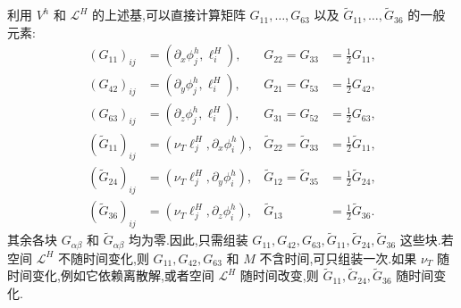 \begin{note}[方法(8.288)的实现]
利用 $V^h$ 和 $\mathcal L^H$ 的上述基,可以直接计算矩阵 $G_{11},\ldots,G_{63}$ 以及 $\widetilde G_{11},\ldots,\widetilde G_{36}$ 的一般元素:
\begin{equation}\label{eq:vms-coarse-projection-implementation-blocks}
\begin{aligned}
 (G_{11})_{ij}&=(\partial_x\phi_j^h,\ell_i^H),
 &G_{22}=G_{33}&=\tfrac12G_{11},\\
 (G_{42})_{ij}&=(\partial_y\phi_j^h,\ell_i^H),
 &G_{21}=G_{53}&=\tfrac12G_{42},\\
 (G_{63})_{ij}&=(\partial_z\phi_j^h,\ell_i^H),
 &G_{31}=G_{52}&=\tfrac12G_{63},\\[1mm]
 (\widetilde G_{11})_{ij}&=(\nu_T\ell_j^H,\partial_x\phi_i^h),
 &\widetilde G_{22}=\widetilde G_{33}&=\tfrac12\widetilde G_{11},\\
 (\widetilde G_{24})_{ij}&=(\nu_T\ell_j^H,\partial_y\phi_i^h),
 &\widetilde G_{12}=\widetilde G_{35}&=\tfrac12\widetilde G_{24},\\
 (\widetilde G_{36})_{ij}&=(\nu_T\ell_j^H,\partial_z\phi_i^h),
 &\widetilde G_{13}&=\tfrac12\widetilde G_{36}.
\end{aligned}
\end{equation}
其余各块 $G_{\alpha\beta}$ 和 $\widetilde G_{\alpha\beta}$ 均为零.因此,只需组装 $G_{11},G_{42},G_{63},\widetilde G_{11},\widetilde G_{24},\widetilde G_{36}$ 这些块.若空间 $\mathcal L^H$ 不随时间变化,则 $G_{11},G_{42},G_{63}$ 和 $M$ 不含时间,可只组装一次.如果 $\nu_T$ 随时间变化,例如它依赖离散解,或者空间 $\mathcal L^H$ 随时间改变,则 $\widetilde G_{11},\widetilde G_{24},\widetilde G_{36}$ 随时间变化.


\end{note}
